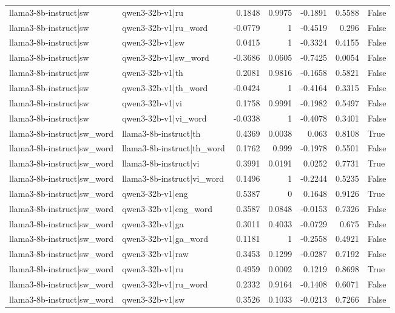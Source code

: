 \begin{table}
\begin{tabular}{l l r r r r l}
llama3-8b-instruct|sw & qwen3-32b-v1|ru & 0.1848 & 0.9975 & -0.1891 & 0.5588 & False \\
llama3-8b-instruct|sw & qwen3-32b-v1|ru_word & -0.0779 & 1 & -0.4519 & 0.296 & False \\
llama3-8b-instruct|sw & qwen3-32b-v1|sw & 0.0415 & 1 & -0.3324 & 0.4155 & False \\
llama3-8b-instruct|sw & qwen3-32b-v1|sw_word & -0.3686 & 0.0605 & -0.7425 & 0.0054 & False \\
llama3-8b-instruct|sw & qwen3-32b-v1|th & 0.2081 & 0.9816 & -0.1658 & 0.5821 & False \\
llama3-8b-instruct|sw & qwen3-32b-v1|th_word & -0.0424 & 1 & -0.4164 & 0.3315 & False \\
llama3-8b-instruct|sw & qwen3-32b-v1|vi & 0.1758 & 0.9991 & -0.1982 & 0.5497 & False \\
llama3-8b-instruct|sw & qwen3-32b-v1|vi_word & -0.0338 & 1 & -0.4078 & 0.3401 & False \\
llama3-8b-instruct|sw_word & llama3-8b-instruct|th & 0.4369 & 0.0038 & 0.063 & 0.8108 & True \\
llama3-8b-instruct|sw_word & llama3-8b-instruct|th_word & 0.1762 & 0.999 & -0.1978 & 0.5501 & False \\
llama3-8b-instruct|sw_word & llama3-8b-instruct|vi & 0.3991 & 0.0191 & 0.0252 & 0.7731 & True \\
llama3-8b-instruct|sw_word & llama3-8b-instruct|vi_word & 0.1496 & 1 & -0.2244 & 0.5235 & False \\
llama3-8b-instruct|sw_word & qwen3-32b-v1|eng & 0.5387 & 0 & 0.1648 & 0.9126 & True \\
llama3-8b-instruct|sw_word & qwen3-32b-v1|eng_word & 0.3587 & 0.0848 & -0.0153 & 0.7326 & False \\
llama3-8b-instruct|sw_word & qwen3-32b-v1|ga & 0.3011 & 0.4033 & -0.0729 & 0.675 & False \\
llama3-8b-instruct|sw_word & qwen3-32b-v1|ga_word & 0.1181 & 1 & -0.2558 & 0.4921 & False \\
llama3-8b-instruct|sw_word & qwen3-32b-v1|raw & 0.3453 & 0.1299 & -0.0287 & 0.7192 & False \\
llama3-8b-instruct|sw_word & qwen3-32b-v1|ru & 0.4959 & 0.0002 & 0.1219 & 0.8698 & True \\
llama3-8b-instruct|sw_word & qwen3-32b-v1|ru_word & 0.2332 & 0.9164 & -0.1408 & 0.6071 & False \\
llama3-8b-instruct|sw_word & qwen3-32b-v1|sw & 0.3526 & 0.1033 & -0.0213 & 0.7266 & False \\

\end{tabular}
\end{table}
